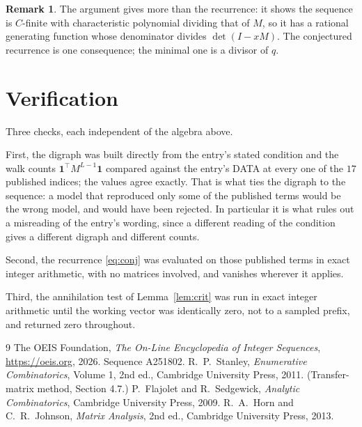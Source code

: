 \documentclass[11pt,a4paper]{article}
\theoremstyle{plain}
\theoremstyle{definition}
\newtheorem{remark}[theorem]{Remark}
\begin{document}
\begin{remark}
The argument gives more than the recurrence: it shows the sequence is $C$-finite with
characteristic polynomial dividing that of $M$, so it has a rational generating function
whose denominator divides $\det(I-xM)$. The conjectured recurrence is one consequence; the
minimal one is a divisor of $q$.
\end{remark}

\section{Verification}

Three checks, each independent of the algebra above.

First, the digraph was built directly from the entry's stated condition and the walk counts
$\mathbf{1}^{\!\top}M^{L-1}\mathbf{1}$ compared against the entry's DATA at
every one of the $17$ published indices; the values agree exactly. That is what ties
the digraph to the sequence: a model that reproduced only some of the published terms would
be the wrong model, and would have been rejected. In particular it is what rules out a
misreading of the entry's wording, since a different reading of the condition gives a
different digraph and different counts.

Second, the recurrence \eqref{eq:conj} was evaluated on those published terms in exact
integer arithmetic, with no matrices involved, and vanishes wherever it applies.

Third, the annihilation test of Lemma~\ref{lem:crit} was run in exact integer arithmetic
until the working vector was identically zero, not to a sampled prefix, and returned zero
throughout.

\begin{thebibliography}{9}
 The OEIS Foundation, \emph{The On-Line Encyclopedia of Integer
Sequences}, \url{https://oeis.org}, 2026. Sequence A251802.
 R.~P.~Stanley, \emph{Enumerative Combinatorics}, Volume 1, 2nd ed.,
Cambridge University Press, 2011. (Transfer-matrix method, Section 4.7.)
 P.~Flajolet and R.~Sedgewick, \emph{Analytic Combinatorics}, Cambridge
University Press, 2009.
 R.~A.~Horn and C.~R.~Johnson, \emph{Matrix Analysis}, 2nd ed., Cambridge
University Press, 2013.
\end{thebibliography}
\end{document}
